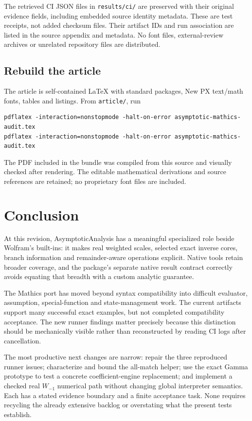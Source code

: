 \documentclass[11pt,letterpaper]{article}
\newcommand{\code}[1]{\texttt{\detokenize{#1}}}
\newcommand{\pathcode}[1]{\nolinkurl{#1}}
\begin{document}
The retrieved CI JSON files in \pathcode{results/ci/} are preserved with their original evidence fields, including embedded source identity metadata. These are test receipts, not added checksum files. Their artifact IDs and run association are listed in the source appendix and metadata. No font files, external-review archives or unrelated repository files are distributed.

\subsection{Rebuild the article}
The article is self-contained LaTeX with standard packages, New PX text/math fonts, tables and listings. From \pathcode{article/}, run
\begin{lstlisting}
pdflatex -interaction=nonstopmode -halt-on-error asymptotic-mathics-audit.tex
pdflatex -interaction=nonstopmode -halt-on-error asymptotic-mathics-audit.tex
\end{lstlisting}
The PDF included in the bundle was compiled from this source and visually checked after rendering. The editable mathematical derivations and source references are retained; no proprietary font files are included.

\section{Conclusion}
At this revision, AsymptoticAnalysis has a meaningful specialized role beside Wolfram's built-ins: it makes real weighted scales, selected exact inverse cores, branch information and remainder-aware operations explicit. Native tools retain broader coverage, and the package's separate native result contract correctly avoids equating that breadth with a custom analytic guarantee.

The Mathics port has moved beyond syntax compatibility into difficult evaluator, assumption, special-function and state-management work. The current artifacts support many successful exact examples, but not completed compatibility acceptance. The new runner findings matter precisely because this distinction should be mechanically visible rather than reconstructed by reading CI logs after cancellation.

The most productive next changes are narrow: repair the three reproduced runner issues; characterize and bound the all-match \code{FirstPosition} helper; use the exact Gamma prototype to test a concrete coefficient-engine replacement; and implement a checked real $W_{-1}$ numerical path without changing global interpreter semantics. Each has a stated evidence boundary and a finite acceptance task. None requires recycling the already extensive backlog or overstating what the present tests establish.
\end{document}
